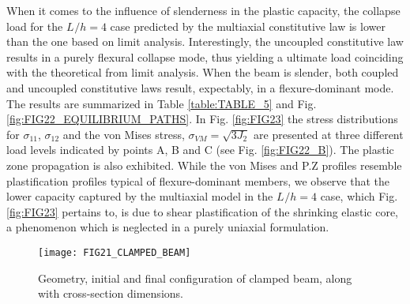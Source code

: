 When it comes to the influence of slenderness in the plastic capacity, the 
collapse 
load for the $L^{}/h=4$ case predicted by the multiaxial constitutive law is 
lower than the one based on limit analysis. Interestingly, the uncoupled 
constitutive law results in a purely flexural collapse mode, thus yielding a 
ultimate load coinciding with the theoretical from limit analysis. When the 
beam is slender, both coupled and uncoupled constitutive laws result, 
expectably, in a flexure-dominant mode. The results are summarized in Table 
\ref{table:TABLE_5} and Fig. \ref{fig:FIG22_EQUILIBRIUM_PATHS}. In Fig. 
\ref{fig:FIG23} the stress distributions for $\sigma_{11}$, $\sigma_{12}$ and 
the von Mises stress, $\sigma_{VM}=\sqrt{3J_2}$ are presented at three 
different load levels indicated by points A, B and C (see Fig. 
\ref{fig:FIG22_B}). 
The plastic zone propagation is also exhibited. While the von Mises and P.Z 
profiles resemble plastification profiles typical of flexure-dominant members, 
we observe that the lower 
capacity captured by the multiaxial model in the $L^{}/h=4$ case, which Fig. 
\ref{fig:FIG23} pertains to, is due to shear plastification of the shrinking 
elastic core, a phenomenon which is neglected in a purely uniaxial formulation.

\begin{figure}
	\centering
	\texttt{[image: FIG21\_CLAMPED\_BEAM]}
	\caption{Geometry, initial and final configuration of clamped beam, along 
		with cross-section dimensions.}
	\label{fig:FIG21_CLAMPED_BEAM}
\end{figure}

\noindent{}

